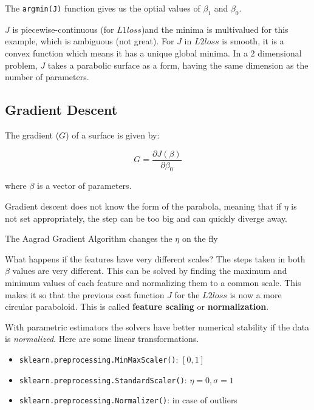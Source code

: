 \par
The \texttt{argmin(J)} function gives us the optial values of  $\beta_1$ and
$\beta_0$.

\par
$J$ is piecewise-continuous (for $L1 loss$)and the minima is multivalued for this
example, which is ambiguous (not great). For $J$ in $L2 loss$ is smooth, it is a
convex function which means it has a unique global minima. In a 2 dimensional
problem, $J$ takes a parabolic surface as a form, having the same dimension as
the number of parameters.

\subsection{Gradient Descent}

\par
The gradient ($G$) of a surface is given by:

$$
	G = \frac{\partial J(\beta)}{\partial \beta_0}
$$

where $\beta$ is a vector of parameters.


\par
Gradient descent does not know the form of the parabola, meaning that if $\eta$
is not set appropriately, the step can be too big and can quickly diverge away.


\par
The Aagrad Gradient Algorithm changes the $\eta$ on the fly


\par
What happens if the features have very different scales? The steps taken in both
$\beta$ values are very different. This can be solved by finding the maximum and
minimum values of each feature and normalizing them to a common scale. This
makes it so that the previous cost function $J$ for the $L2 loss$ is now a more
circular paraboloid. This is called \textbf{feature scaling} or
\textbf{normalization}.

\par
With parametric estimators the solvers have better numerical stability if the
data is \textit{normalized}. Here are some linear transformations.

\begin{itemize}
	\item \texttt{sklearn.preprocessing.MinMaxScaler()}: $[0,1]$
	\item \texttt{sklearn.preprocessing.StandardScaler()}: $\eta = 0, \sigma = 1$
	\item \texttt{sklearn.preprocessing.Normalizer()}: in case of outliers
\end{itemize}

